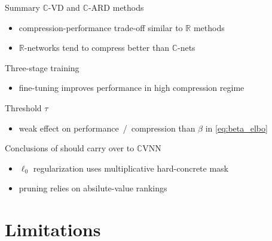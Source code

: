 \documentclass{beamer}
\newcommand{\real}{\mathbb{R}}
\newcommand{\cplx}{\mathbb{C}}
\begin{document}
\begin{frame}[c]{Summary}{\insertsection}
  $\cplx$-VD and $\cplx$-ARD methods
  \begin{itemize}
    \item compression-performance trade-off similar to $\real$ methods
    \smallskip
    \item $\real$-networks tend to compress better than $\cplx$-nets
  \end{itemize}

  \medskip
  Three-stage training
  \begin{itemize}
    \item fine-tuning improves performance in high compression regime
  \end{itemize}

  \medskip
  Threshold $\tau$
  \begin{itemize}
    \item weak effect on performance~/~compression than $\beta$ in \eqref{eq:beta_elbo}
  \end{itemize}

  \medskip
  Conclusions of \citep{gale_state_2019} should carry over to $\cplx$VNN
  \begin{itemize}
    \item $\ell_0$ regularization uses multiplicative hard-concrete mask
      {\tiny \\ \citep{louizos_learning_2018}}
    \item pruning relies on absilute-value rankings
      {\tiny \\ \citep{zhu_prune_2018}}
  \end{itemize}
\end{frame}


\section{Limitations} %
\label{sec:further_developments}
\end{document}
